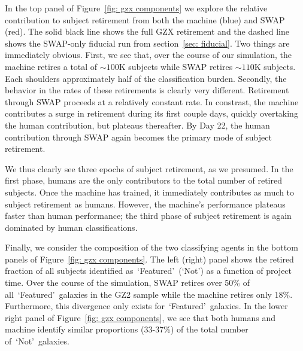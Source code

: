 \documentclass[twocolumn]{aastex6}
\newcommand{\feat}{`Featured'}
\newcommand{\notfeat}{`Not'}
\begin{document}
In the top panel of Figure~\ref{fig: gzx components} we explore the relative 
contribution to subject retirement from both the machine (blue) and SWAP (red). 
The solid black line shows the full GZX retirement 
and the dashed line shows the SWAP-only fiducial run from section~\ref{sec: fiducial}. 
Two things are immediately obvious. 
First, we see that, over the course of our simulation, the machine retires a total of 
$\sim100$K subjects while SWAP retires $\sim110$K subjects. Each shoulders approximately
half of the classification burden. Secondly, the behavior in the rates of these
retirements is clearly very different. Retirement through SWAP proceeds at a relatively
constant rate. In constrast, the machine contributes a surge in retirement during 
its first couple days, quickly overtaking the human contribution, but plateaus thereafter.
By Day 22, the human contribution through SWAP again becomes the primary mode 
of subject retirement. 

We thus clearly see three epochs of subject retirement, as we presumed.
In the first phase, humans are the only contributors to the total number of retired subjects.  
Once the machine has trained, it immediately contributes as much to subject retirement as humans.
However, the machine's performance plateaus faster than human performance;  the third 
phase of subject retirement is again dominated by human classifications.

Finally, we consider the composition of the two classifying agents in the bottom 
panels of Figure~\ref{fig: gzx components}. The left (right) panel shows the 
retired fraction of all subjects identified as~\feat~(\notfeat) as a function of project time. 
Over the course of the simulation, SWAP retires over 50\% of all~\feat~galaxies 
in the GZ2 sample while the machine retires only 18\%. Furthermore, this divergence 
only exists for~\feat~galaxies. In the lower right panel of  Figure~\ref{fig: gzx components}, 
we see that both humans and machine identify similar proportions (33-37\%) of 
the total number of~\notfeat~galaxies. 
\end{document}
